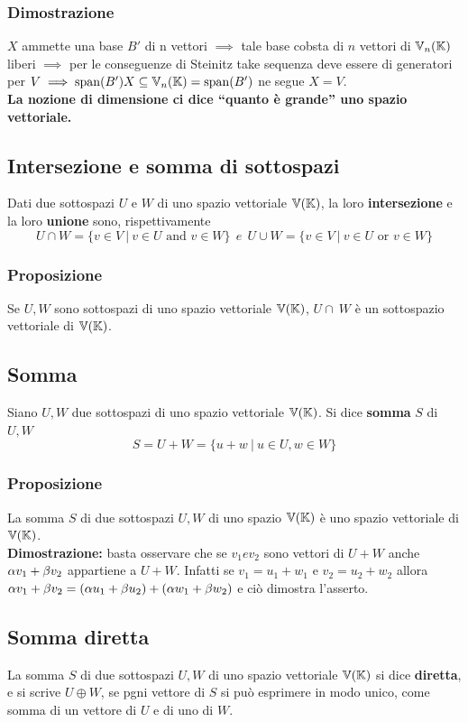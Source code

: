 \documentclass[../main.tex]{subfiles}
\begin{document}
\subsubsection{Dimostrazione}
$X$ ammette una base $B'$ di n vettori $\implies$ tale base cobsta di $n$ vettori di $\mathbb{V}_n (\mathbb{K})$ liberi $\implies$ per le conseguenze di Steinitz take sequenza deve essere di generatori per $V\implies\operatorname{span}(B') X\subseteq\mathbb{V}_n (\mathbb{K})=\operatorname{span}(B')$ ne segue $X = V$.\\
\textbf{La nozione di dimensione ci dice ``quanto è grande'' uno spazio vettoriale.}

\subsection{Intersezione e somma di sottospazi}
Dati due sottospazi $U$ e $W$ di uno spazio vettoriale $\mathbb{V} (\mathbb{K})$, la loro
\textbf{intersezione} e la loro \textbf{unione} sono, rispettivamente
\[
    U \cap W = \{v\in V \ | \ v\in U \text{ and } v\in W  \} \ \ e \ \ U \cup W = \{v\in V \ | \ v\in U \text{ or } v\in W  \}
\]

\subsubsection{Proposizione}
Se $U, W$ sono sottospazi di uno spazio vettoriale $\mathbb{V} (\mathbb{K})$, $U\cap\ W$ è un
sottospazio vettoriale di $\mathbb{V} (\mathbb{K})$.

\subsection{Somma}
Siano $U, W$ due sottospazi di uno spazio vettoriale $\mathbb{V} (\mathbb{K})$. Si dice
\textbf{somma} $S$ di $U, W$
\[
    S = U + W = \{u+w \ | \ u \in U,w\in W\}
\]
\subsubsection{Proposizione}
La somma $S$ di due sottospazi $U, W$ di uno spazio $\mathbb{V} (\mathbb{K})$ è uno spazio
vettoriale di $\mathbb{V} (\mathbb{K})$.\\ \textbf{Dimostrazione:} basta osservare che se $v_1 e
    v_2$ sono vettori di $U+W$ anche $\alpha{} v_1+\beta{} v_2$ appartiene a $U+W$.
Infatti se $v_1 = u_1+w_1$ e $v_2 = u_2 + w_2$ allora $\alpha{} v_1 + \beta{} v_2 =
    (\alpha{} u_1 + \beta{} u_2)+ (\alpha{} w_1 + \beta{} w_2)$ e ciò dimostra l'asserto.

\subsection{Somma diretta}
La somma $S$ di due sottospazi $U,W$ di uno spazio vettoriale $\mathbb{V} (\mathbb{K})$ si dice
\textbf{diretta}, e si scrive $U\oplus{W}$, se pgni vettore di $S$ si può
esprimere in modo unico, come somma di un vettore di $U$ e di uno di $W$.
\end{document}

